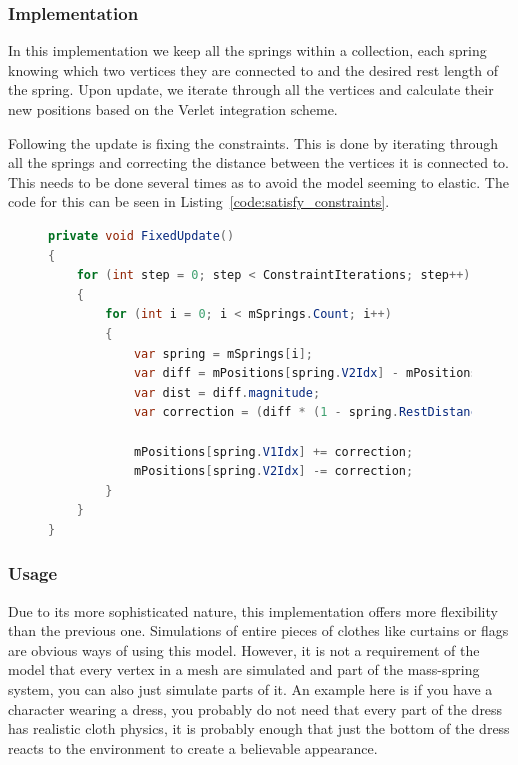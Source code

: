 \subsubsection{Implementation}
In this implementation we keep all the springs within a collection, each spring knowing which two vertices they are connected to and the desired rest length of the spring.
Upon update, we iterate through all the vertices and calculate their new positions based on the Verlet integration scheme.

Following the update is fixing the constraints. This is done by iterating through all the springs and correcting the distance between the vertices it is connected to.
This needs to be done several times as to avoid the model seeming to elastic.
The code for this can be seen in Listing~\ref{code:satisfy_constraints}.

\begin{figure}
\begin{lstlisting}[label={code:satisfy_constraints},language=csharp,caption={Semi-Implicit Euler Integration}]
private void FixedUpdate()
{
    for (int step = 0; step < ConstraintIterations; step++)
    {
        for (int i = 0; i < mSprings.Count; i++)
        {
            var spring = mSprings[i];
            var diff = mPositions[spring.V2Idx] - mPositions[spring.V1Idx];
            var dist = diff.magnitude;
            var correction = (diff * (1 - spring.RestDistance / dist)) * 0.5f;

            mPositions[spring.V1Idx] += correction;
            mPositions[spring.V2Idx] -= correction;
        }
    }
}
\end{lstlisting}
\end{figure}

\subsubsection{Usage}
Due to its more sophisticated nature, this implementation offers more flexibility than the previous one.
Simulations of entire pieces of clothes like curtains or flags are obvious ways of using this model.
However, it is not a requirement of the model that every vertex in a mesh are simulated and part of the mass-spring system, you can also just simulate parts of it.
An example here is if you have a character wearing a dress, you probably do not need that every part of the dress
has realistic cloth physics, it is probably enough that just the bottom of the dress reacts to the environment
to create a believable appearance.

